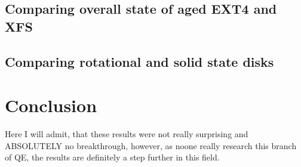 \documentclass[
  color, %
  table, %
  lof,   %
  lot,   %
]{fithesis3}
\begin{document}
\section{Comparing overall state of aged EXT4 and XFS}
\section{Comparing rotational and solid state disks}
\chapter{Conclusion}
Here I will admit, that these results were not really surprising and ABSOLUTELY no breakthrough, however, as noone really research this branch of QE, the results are definitely a step further in this field.
\end{document}
